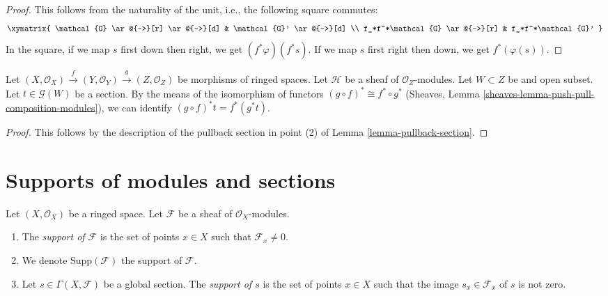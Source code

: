 \begin{proof}
This follows from the naturality of the unit, i.e.,
the following square commutes:
$$
\xymatrix{
	\mathcal{G} \ar@{->}[r] \ar@{->}[d] & \mathcal{G}' \ar@{->}[d] \\
	f_*f^*\mathcal{G} \ar@{->}[r] & f_*f^*\mathcal{G}'
}
$$
In the square, if we map $s$ first down then right,
we get $(f^*\varphi)(f^*s)$. If we map $s$ first right then down,
we get $f^*(\varphi(s))$.
\end{proof}

\begin{lemma}
\label{lemma-pullback-section-functorial}
Let
$(X,\mathcal{O}_X)
\xrightarrow{f}(Y,\mathcal{O}_Y)
\xrightarrow{g}(Z,\mathcal{O}_Z)$ be morphisms of ringed spaces.
Let $\mathcal{H}$ be a sheaf of $\mathcal{O}_Z$-modules.
Let $W\subset Z$ be and open subset.
Let $t\in\mathcal{G}(W)$ be a section.
By the means of the isomorphism of functors
$(g\circ f)^*\cong f^*\circ g^*$
(Sheaves, Lemma \ref{sheaves-lemma-push-pull-composition-modules}),
we can identify $(g\circ f)^*t=f^*(g^*t)$.
\end{lemma}

\begin{proof}
This follows by the description of the pullback section
in point (2) of Lemma \ref{lemma-pullback-section}.
\end{proof}





\section{Supports of modules and sections}
\label{section-support}

\begin{definition}
\label{definition-support}
Let $(X, \mathcal{O}_X)$ be a ringed space.
Let $\mathcal{F}$ be a sheaf of $\mathcal{O}_X$-modules.
\begin{enumerate}
\item The {\it support of $\mathcal{F}$} is the set of
points $x \in X$ such that $\mathcal{F}_x \not = 0$.
\item We denote $\text{Supp}(\mathcal{F})$ the support of $\mathcal{F}$.
\item Let $s \in \Gamma(X, \mathcal{F})$ be a global section.
The {\it support of $s$} is the set of points $x \in X$
such that the image $s_x \in \mathcal{F}_x$ of $s$ is
not zero.
\end{enumerate}
\end{definition}

